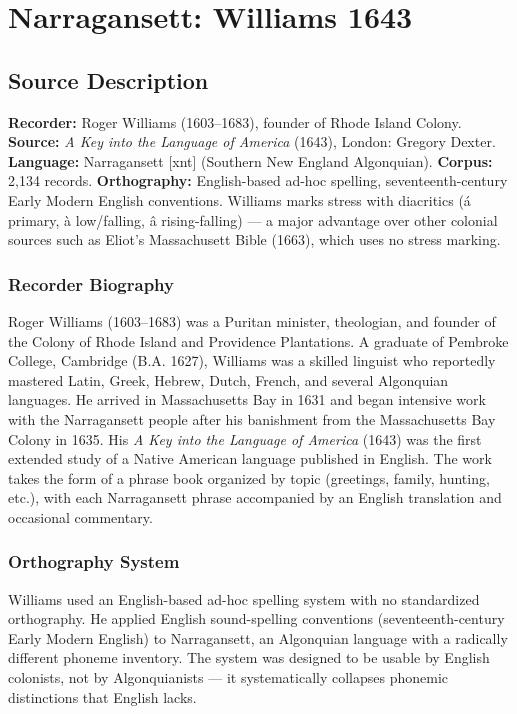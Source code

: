 
\section{Narragansett: Williams 1643}
\label{sec:1362}

\subsection{Source Description}

\textbf{Recorder:} Roger Williams (1603--1683), founder of Rhode Island Colony.
\textbf{Source:} \emph{A Key into the Language of America} (1643), London: Gregory Dexter.
\textbf{Language:} Narragansett [xnt] (Southern New England Algonquian).
\textbf{Corpus:} 2,134 records.
\textbf{Orthography:} English-based ad-hoc spelling, seventeenth-century Early
Modern English conventions. Williams marks stress with diacritics (á primary,
à low/falling, â rising-falling) --- a major advantage over other colonial
sources such as Eliot's Massachusett Bible (1663), which uses no stress
marking.

\subsubsection{Recorder Biography}

Roger Williams (1603--1683) was a Puritan minister, theologian, and founder
of the Colony of Rhode Island and Providence Plantations. A graduate of
Pembroke College, Cambridge (B.A. 1627), Williams was a skilled linguist who
reportedly mastered Latin, Greek, Hebrew, Dutch, French, and several
Algonquian languages. He arrived in Massachusetts Bay in 1631 and began
intensive work with the Narragansett people after his banishment from the
Massachusetts Bay Colony in 1635. His \emph{A Key into the Language of
America} (1643) was the first extended study of a Native American language
published in English. The work takes the form of a phrase book organized by
topic (greetings, family, hunting, etc.), with each Narragansett phrase
accompanied by an English translation and occasional commentary.

\subsubsection{Orthography System}

Williams used an English-based ad-hoc spelling system with no standardized
orthography. He applied English sound-spelling conventions (seventeenth-century
Early Modern English) to Narragansett, an Algonquian language with a radically
different phoneme inventory. The system was designed to be usable by English
colonists, not by Algonquianists --- it systematically collapses phonemic
distinctions that English lacks.

